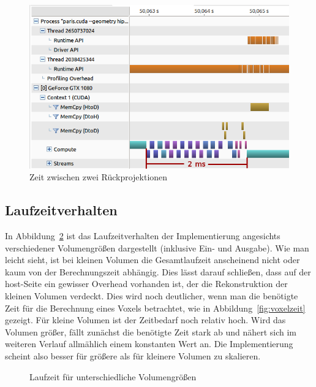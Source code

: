 \begin{figure}
    \includegraphics[width=\linewidth]{img/timeline_compute3}
    \caption{Zeit zwischen zwei Rückprojektionen\label{fig:kernel_wait}} 
\end{figure}

\subsection{Laufzeitverhalten}

In Abbildung~\ref{fig:laufzeit_gpu} ist das Laufzeitverhalten der Implementierung angesichts verschiedener Volumengrößen
dargestellt (inklusive Ein- und Ausgabe). Wie man leicht sieht, ist bei kleinen Volumen die Gesamtlaufzeit anscheinend
nicht oder kaum von der Berechnungszeit abhängig. Dies lässt darauf schließen, dass auf der \gls{host}-Seite ein
gewisser Overhead vorhanden ist, der die Rekonstruktion der kleinen Volumen verdeckt. Dies wird noch deutlicher, wenn
man die benötigte Zeit für die Berechnung eines Voxels betrachtet, wie in Abbildung~\ref{fig:voxelzeit} gezeigt. Für
kleine Volumen ist der Zeitbedarf noch relativ hoch. Wird das Volumen größer, fällt zunächst die benötigte Zeit stark ab
und nähert sich im weiteren Verlauf allmählich einem konstanten Wert an. Die Implementierung scheint also besser für
größere als für kleinere Volumen zu skalieren.

\begin{figure}
    \centering
    \caption{Laufzeit für unterschiedliche Volumengrößen}\label{fig:laufzeit_gpu} 
\end{figure}

